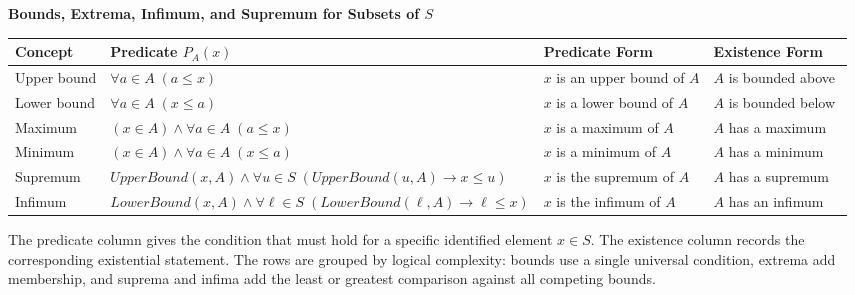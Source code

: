 \begin{center}

\end{center}

\begin{center}
\small
\textbf{Bounds, Extrema, Infimum, and Supremum for Subsets of $S$}
\end{center}

\medskip

\begin{center}
\renewcommand{\arraystretch}{1.6}
\begin{tabular}{@{} p{2.4cm} p{6.2cm} p{3.0cm} p{3.2cm} @{}}
\hline
\textbf{Concept} & \textbf{Predicate $P_A(x)$} & \textbf{Predicate Form} & \textbf{Existence Form} \\
\hline
Upper bound
&
$\forall a \in A \; (a \le x)$
&
$x$ is an upper bound of $A$
&
$A$ is bounded above$
$
\\[0.2em]

Lower bound
&
$\forall a \in A \; (x \le a)$
&
$x$ is a lower bound of $A$
&
$A$ is bounded below
$
$
\\
\hline

Maximum
&
$(x \in A) \land \forall a \in A \; (a \le x)$
&
$x$ is a maximum of $A$
&
$A$ has a maximum
$
$
\\[0.2em]

Minimum
&
$(x \in A) \land \forall a \in A \; (x \le a)$
&
$x$ is a minimum of $A$
&
$A$ has a minimum
$
$
\\
\hline

Supremum
&
$UpperBound(x,A)
\land
\forall u \in S \; (UpperBound(u,A) \rightarrow x \le u)$
&
$x$ is the supremum of $A$
&
$A$ has a supremum
$
$
\\[0.2em]

Infimum
&
$LowerBound(x,A)
\land
\forall \ell \in S \; (LowerBound(\ell,A) \rightarrow \ell \le x)$
&
$x$ is the infimum of $A$
&
$A$ has an infimum
$
$
\\
\hline
\end{tabular}
\end{center}

\medskip

\begin{remark*}
The predicate column gives the condition that must hold for a specific
identified element $x \in S$. The existence column records the corresponding
existential statement. The rows are grouped by logical complexity: bounds use a
single universal condition, extrema add membership, and suprema and infima add
the least or greatest comparison against all competing bounds.
\end{remark*}












